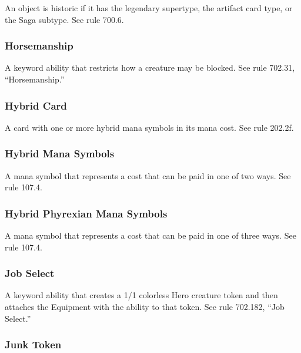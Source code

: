 {{{{{{{{{{{{{{{An object is historic if it has the legendary supertype, the artifact card type, or the Saga subtype. See rule 700.6.

\subsubsection*{Horsemanship}

A keyword ability that restricts how a creature may be blocked. See rule 702.31, “Horsemanship.”

\subsubsection*{Hybrid Card}

A card with one or more hybrid mana symbols in its mana cost. See rule 202.2f.

\subsubsection*{Hybrid Mana Symbols}

A mana symbol that represents a cost that can be paid in one of two ways. See rule 107.4.

\subsubsection*{Hybrid Phyrexian Mana Symbols}

A mana symbol that represents a cost that can be paid in one of three ways. See rule 107.4.

\subsubsection*{Job Select}

A keyword ability that creates a 1/1 colorless Hero creature token and then attaches the Equipment with the ability to that token. See rule 702.182, “Job Select.”

\subsubsection*{Junk Token}

}}}}}}}}}}}}}}}

